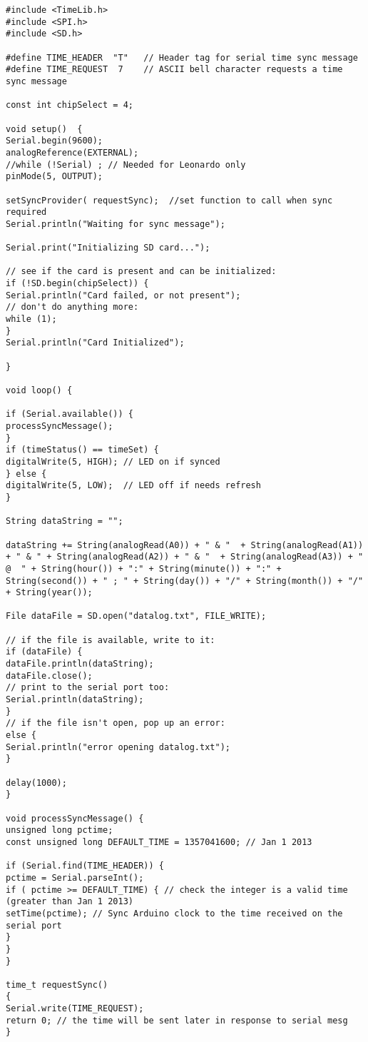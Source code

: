 \begin{lstlisting}[caption=Arduino Code,label=code:label]
#include <TimeLib.h>
#include <SPI.h>
#include <SD.h>

#define TIME_HEADER  "T"   // Header tag for serial time sync message
#define TIME_REQUEST  7    // ASCII bell character requests a time sync message 

const int chipSelect = 4;

void setup()  {
Serial.begin(9600);
analogReference(EXTERNAL);
//while (!Serial) ; // Needed for Leonardo only
pinMode(5, OUTPUT);

setSyncProvider( requestSync);  //set function to call when sync required
Serial.println("Waiting for sync message");

Serial.print("Initializing SD card...");

// see if the card is present and can be initialized:
if (!SD.begin(chipSelect)) {
Serial.println("Card failed, or not present");
// don't do anything more:
while (1);
}
Serial.println("Card Initialized");

}

void loop() {

if (Serial.available()) {
processSyncMessage();
}
if (timeStatus() == timeSet) {
digitalWrite(5, HIGH); // LED on if synced
} else {
digitalWrite(5, LOW);  // LED off if needs refresh
}

String dataString = "";

dataString += String(analogRead(A0)) + " & "  + String(analogRead(A1)) + " & " + String(analogRead(A2)) + " & "  + String(analogRead(A3)) + "  @  " + String(hour()) + ":" + String(minute()) + ":" + String(second()) + " ; " + String(day()) + "/" + String(month()) + "/" + String(year());

File dataFile = SD.open("datalog.txt", FILE_WRITE);

// if the file is available, write to it:
if (dataFile) {
dataFile.println(dataString);
dataFile.close();
// print to the serial port too:
Serial.println(dataString);
}
// if the file isn't open, pop up an error:
else {
Serial.println("error opening datalog.txt");
}

delay(1000);
}

void processSyncMessage() {
unsigned long pctime;
const unsigned long DEFAULT_TIME = 1357041600; // Jan 1 2013

if (Serial.find(TIME_HEADER)) {
pctime = Serial.parseInt();
if ( pctime >= DEFAULT_TIME) { // check the integer is a valid time (greater than Jan 1 2013)
setTime(pctime); // Sync Arduino clock to the time received on the serial port
}
}
}

time_t requestSync()
{
Serial.write(TIME_REQUEST);
return 0; // the time will be sent later in response to serial mesg
}

\end{lstlisting}

